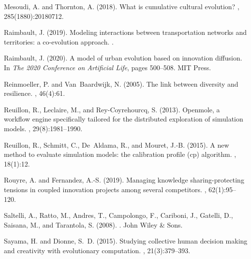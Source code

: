 \documentclass[letterpaper]{article}
\begin{document}
\begin{thebibliography}{}
Mesoudi, A. and Thornton, A. (2018).
\newblock What is cumulative cultural evolution?
, 285(1880):20180712.

Raimbault, J. (2019).
\newblock Modeling interactions between transportation networks and
  territories: a co-evolution approach.
.

Raimbault, J. (2020).
\newblock A model of urban evolution based on innovation diffusion.
\newblock In {\em The 2020 Conference on Artificial Life}, pages 500--508. MIT
  Press.

Reinmoeller, P. and Van~Baardwijk, N. (2005).
\newblock The link between diversity and resilience.
, 46(4):61.

Reuillon, R., Leclaire, M., and Rey-Coyrehourcq, S. (2013).
\newblock Openmole, a workflow engine specifically tailored for the distributed
  exploration of simulation models.
, 29(8):1981--1990.

Reuillon, R., Schmitt, C., De~Aldama, R., and Mouret, J.-B. (2015).
\newblock A new method to evaluate simulation models: the calibration profile
  (cp) algorithm.
,
  18(1):12.

Rouyre, A. and Fernandez, A.-S. (2019).
\newblock Managing knowledge sharing-protecting tensions in coupled innovation
  projects among several competitors.
, 62(1):95--120.

Saltelli, A., Ratto, M., Andres, T., Campolongo, F., Cariboni, J., Gatelli, D.,
  Saisana, M., and Tarantola, S. (2008).
.
\newblock John Wiley \& Sons.

Sayama, H. and Dionne, S.~D. (2015).
\newblock Studying collective human decision making and creativity with
  evolutionary computation.
, 21(3):379--393.


\end{thebibliography}
\end{document}
